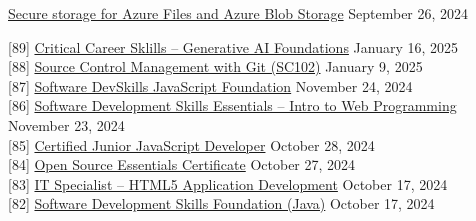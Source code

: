 \documentclass[10pt]{res} %
\begin{document}
\begin{resume}

\vspace{0.025in}

\colorbox{darkblue}{}

\phantom{0}{[1]} \phantom{0}\href{https://learn.microsoft.com/en-us/users/bjpeterdelacruz-0623/credentials/8b2ccd989f6a5381}{\color{blue}Secure storage for Azure Files and Azure Blob Storage} \hfill September 26, 2024

\vspace{0.025in}

\colorbox{darkblue}{}

{[89]} \phantom{0}\href{https://www.credly.com/badges/de9dff4e-37f9-43d0-95a2-b25fa4e2a18e}{\color{blue}Critical Career Sklills -- Generative AI Foundations} \hfill January 16, 2025 \\
{[88]} \phantom{0}\href{https://www.credly.com/badges/82975a29-008c-424c-96ca-ff23b6e3b495}{\color{blue}Source Control Management with Git (SC102)} \hfill January 9, 2025 \\
{[87]} \phantom{0}\href{https://badges.peoplecert.org/Badge/en/2/0D07FA89-47D0-46AB-90C0-17A80DC9B83C?1328}{\color{blue}Software DevSkills JavaScript Foundation} \hfill November 24, 2024 \\
{[86]} \phantom{0}\href{https://badges.peoplecert.org/Badge/en/2/F9D1B41F-36A2-42C2-9E41-AF4748CACABF?1108}{\color{blue}Software Development Skills Essentials -- Intro to Web Programming} \hfill November 23, 2024 \\
{[85]} \phantom{0}\href{https://certificates.dev/c/9d59fb81-051d-456b-9bf5-562f0c687030}{\color{blue}Certified Junior JavaScript Developer} \hfill October 28, 2024 \\
{[84]} \phantom{0}\href{https://www.credly.com/badges/cc74f54c-73fd-467e-8143-4651324a32df}{\color{blue}Open Source Essentials Certificate} \hfill October 27, 2024 \\
{[83]} \phantom{0}\href{https://www.credly.com/badges/2e8e9224-2558-42eb-b4e0-90173250ee51}{\color{blue}IT Specialist -- HTML5 Application Development} \hfill October 17, 2024 \\
{[82]} \phantom{0}\href{https://badges.peoplecert.org/Badge/en/2/E4A55B54-1434-424F-B792-0E24A927864D?1238}{\color{blue}Software Development Skills Foundation (Java)} \hfill October 17, 2024 \\

\end{resume}
\end{document}
